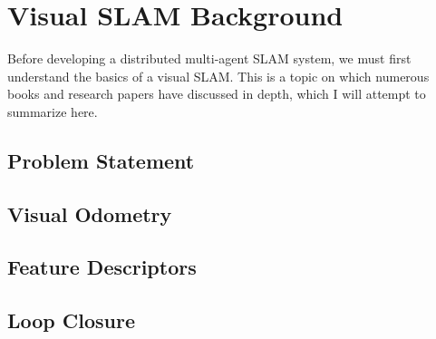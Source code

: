 




\section{Visual SLAM Background}
\label{sec:visual-slam-background}
Before developing a distributed multi-agent SLAM system, we must first understand the basics of a visual SLAM. This is a topic on which numerous books \autocite{gao2021introduction} and research papers \autocite{durrant2006simultaneous} have discussed in depth, which I will attempt to summarize here.

\subsection{Problem Statement}
\label{sec:visual-slam-problem-statement}


\subsection{Visual Odometry}
\label{sec:visual-slam-visual-odometry}


\subsection{Feature Descriptors}
\label{sec:visual-slam-feature-descriptors}


\subsection{Loop Closure}
\label{sec:visual-slam-loop-closure}

